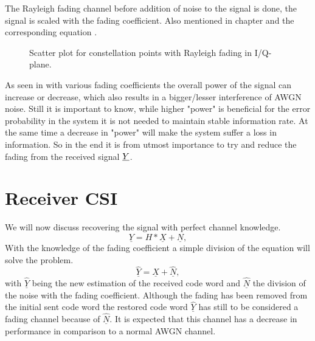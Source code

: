 The Rayleigh fading channel before addition of noise to the signal is done, the signal is scaled with the fading coefficient. Also mentioned in chapter  and the corresponding equation .
\begin{figure}[!htb]
	\setlength{}
	\setlength\fheight{0.4\textheight}
	\centering
		
	\caption{Scatter plot for constellation points with Rayleigh fading in I/Q-plane.}
	\label{fig:scatter}
\end{figure}
As seen in  with various fading coefficients the overall power of the signal can increase or decrease, which also results in a bigger/lesser interference of AWGN noise. Still it is important to know, while higher "power" is beneficial for the error probability in the system it is not needed to maintain stable information rate. At the same time a decrease in "power" will make the system suffer a loss in information. So in the end it is from utmost importance to try and reduce the fading from the received signal $\boldmath\underline{Y}$.
\clearpage
\section{Receiver CSI}
We will now discuss recovering the signal with perfect channel knowledge. 
\begin{equation}
\underline{Y} = H * \underline{X} + \underline{N},
\end{equation}
With the knowledge of the fading coefficient a simple division of the equation will solve the problem.
\begin{equation}
\underline{\hat{Y}} = \underline{X} + \underline{\hat{N}},
\end{equation}
with $\underline{\hat{Y}}$ being the new estimation of the received code word and $\underline{\hat{N}}$ the division of the noise with the fading coefficient.
Although the fading has been removed from the initial sent code word the restored code word \textbf{$\underline{\hat{Y}}$} has still to be considered a fading channel because of $\underline{\hat{N}}$. It is expected that this channel has a decrease in performance in comparison to a normal AWGN channel.

